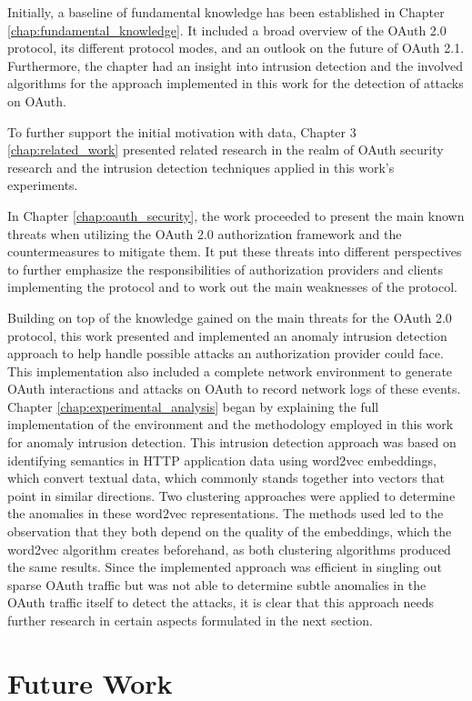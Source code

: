 \documentclass[
    fontsize=12pt,
    headings=small,
    parskip=half,           %
    bibliography=totoc,
    numbers=noenddot,       %
    open=any,               %
    ]{scrreprt}
\begin{document}
Initially, a baseline of fundamental knowledge has been established in Chapter \ref{chap:fundamental_knowledge}. It included a broad overview of the  OAuth 2.0 protocol, its different protocol modes, and an outlook on the future of OAuth 2.1. Furthermore, the chapter had an insight into intrusion detection and the involved algorithms for the approach implemented in this work for the detection of attacks on OAuth. 

To further support the initial motivation with data, Chapter 3
\ref{chap:related_work} presented related research in the realm of OAuth security research and the intrusion detection techniques applied in this work's experiments.

In Chapter \ref{chap:oauth_security}, the work proceeded to present the main known threats when utilizing the OAuth 2.0 authorization framework and the countermeasures to mitigate them. It put these threats into different perspectives to further emphasize the responsibilities of authorization providers and clients implementing the protocol and to work out the main weaknesses of the protocol.

Building on top of the knowledge gained on the main threats for the OAuth 2.0 protocol, this work presented and implemented an anomaly intrusion detection approach to help handle possible attacks an authorization provider could face. This implementation also included a complete network environment to generate OAuth interactions and attacks on OAuth to record network logs of these events. Chapter \ref{chap:experimental_analysis} began by explaining the full implementation of the environment and the methodology employed in this work for anomaly intrusion detection.
This intrusion detection approach was based on identifying semantics in HTTP application data using word2vec embeddings, which convert textual data, which commonly stands together into vectors that point in similar directions. Two clustering approaches were applied to determine the anomalies in these word2vec representations. The methods used led to the observation that they both depend on the quality of the embeddings, which the word2vec algorithm creates beforehand, as both clustering algorithms produced the same results. Since the implemented approach was efficient in singling out sparse OAuth traffic but was not able to determine subtle anomalies in the OAuth traffic itself to detect the attacks, it is clear that this approach needs further research in certain aspects formulated in the next section.

\section{Future Work}
\label{sec:future_work}
\end{document}

